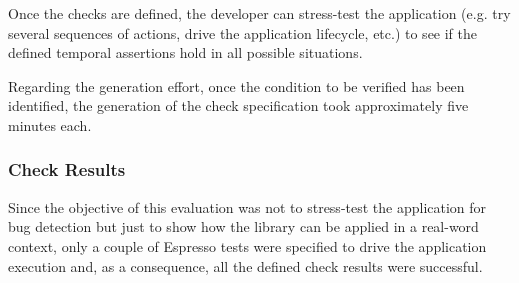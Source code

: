 \documentclass[11pt,a4paper,notitlepage]{article}
\begin{document}
Once the checks are defined, the developer can stress-test the application (e.g. try several sequences of actions, drive the application lifecycle, etc.) to see if the defined temporal assertions hold in all possible situations.

Regarding the generation effort, once the condition to be verified has been identified, the generation of the check specification took approximately five minutes each.

\subsubsection{Check Results}
Since the objective of this evaluation was not to stress-test the application for bug detection but just to show how the library can be applied in a real-word context, only a couple of Espresso tests were specified to drive the application execution and, as a consequence, all the defined check results were successful.
\end{document}
